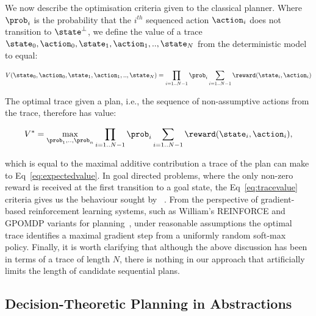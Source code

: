 



We now describe the optimisation criteria given to the classical
planner. Where $\prob_i$ is the probability that the $i^{th}$
sequenced action $\action_i$ does not transition to $\state^\bot$, we
define the value of a trace
$\state_0, \action_0, \state_1, \action_1,.., \state_N$ from the
deterministic model to equal:

\begin{equation}\label{eq:tracevalue}
V(\state_0, \action_0, \state_1, \action_1,.., \state_N) =  \prod_{i=1..N-1} \prob_i \sum_{i=1..N-1} \reward(\state_i, \action_i)
\end{equation}

\noindent The optimal trace given a plan, i.e., the sequence of non-assumptive
actions from the trace, therefore has value:

\[
V^* = \max_{\prob_1, .., \prob_n} \prod_{i=1..N-1} \prob_i \sum_{i=1..N-1}
\reward(\state_i, \action_i),
\]

\noindent which is equal to the maximal 
additive contribution a trace of the plan can make to
Eq~\ref{eq:expectedvalue}.  In goal directed problems, where the only
non-zero reward is received at the first transition to a goal state,
the Eq~\ref{eq:tracevalue} criteria gives us the behaviour sought
by ~\cite{yoon:etal:2007}. From the perspective of
gradient-based reinforcement learning systems, such as William's
REINFORCE and GPOMDP variants for planning~\cite{olivier:doug:2009},
under reasonable assumptions the optimal trace identifies a maximal
gradient step from a uniformly random soft-max policy. Finally, it is
worth clarifying that although the above discussion has been in terms
of a trace of length $N$, there is nothing in our approach that
artificially limits the length of candidate sequential plans.


\subsection{Decision-Theoretic Planning in Abstractions}

